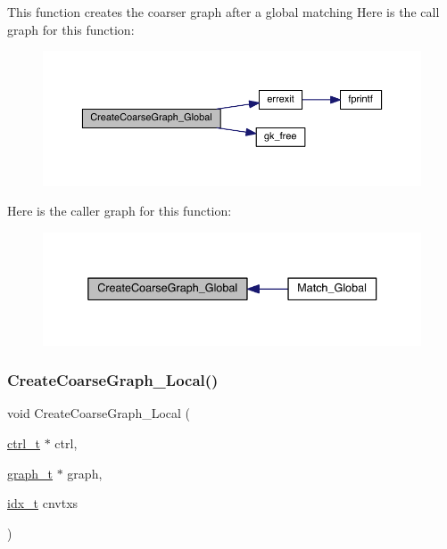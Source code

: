 This function creates the coarser graph after a global matching Here is the call graph for this function\+:\nopagebreak
\begin{figure}[H]
\begin{center}
\leavevmode
\includegraphics[width=350pt]{a00951_add46f66d0e9d6c06e9bf36b386918c83_cgraph}
\end{center}
\end{figure}
Here is the caller graph for this function\+:\nopagebreak
\begin{figure}[H]
\begin{center}
\leavevmode
\includegraphics[width=336pt]{a00951_add46f66d0e9d6c06e9bf36b386918c83_icgraph}
\end{center}
\end{figure}
\mbox{\label{a00951_a15f0a144812a3f4ab58bb38a3398103d}} 
\subsubsection{\texorpdfstring{Create\+Coarse\+Graph\+\_\+\+Local()}{CreateCoarseGraph\_Local()}}
{\footnotesize\ttfamily void Create\+Coarse\+Graph\+\_\+\+Local (\begin{DoxyParamCaption}\item[{\hyperlink{a00742}{ctrl\+\_\+t} $\ast$}]{ctrl,  }\item[{\hyperlink{a00734}{graph\+\_\+t} $\ast$}]{graph,  }\item[{\hyperlink{a00876_aaa5262be3e700770163401acb0150f52}{idx\+\_\+t}}]{cnvtxs }\end{DoxyParamCaption})}

